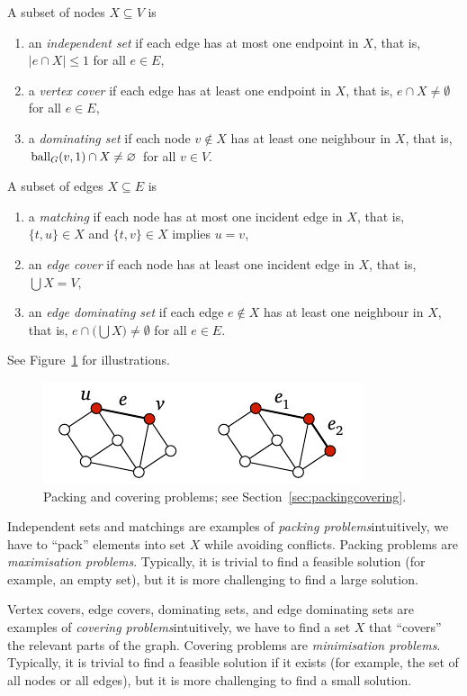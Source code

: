 A subset of nodes $X \subseteq V$ is
\begin{enumerate}
    \item an \emph{independent set} if each edge has at most one endpoint in $X$, that is, $|e \cap X| \le 1$ for all $e \in E$,
    \item a \emph{vertex cover} if each edge has at least one endpoint in $X$, that is, $e \cap X \ne \emptyset$ for all $e \in E$,
    \item a \emph{dominating set} if each node $v \notin X$ has at least one neighbour in $X$, that is, $\operatorname{ball}_G(v,1) \cap X \ne \varnothing$ for all $v \in V$.
\end{enumerate}
A subset of edges $X \subseteq E$ is
\begin{enumerate}[resume]
    \item a \emph{matching} if each node has at most one incident edge in $X$, that is, $\{t,u\} \in X$ and $\{t,v\} \in X$ implies $u = v$,
    \item an \emph{edge cover} if each node has at least one incident edge in $X$, that is, $\bigcup X = V$,
    \item an \emph{edge dominating set} if each edge $e \notin X$ has at least one neighbour in $X$, that is, $e \cap \bigl(\bigcup X\bigr) \ne \emptyset$ for all $e \in E$.
\end{enumerate}
See Figure~\ref{fig:packingcovering} for illustrations.
\begin{figure}
    \centering
    \includegraphics[page=\PPackingCovering]{figs.pdf}
    \caption{Packing and covering problems; see Section~\ref{sec:packingcovering}.}\label{fig:packingcovering}
\end{figure}

Independent sets and matchings are examples of \emph{packing problems}\mydash intuitively, we have to ``pack'' elements into set $X$ while avoiding conflicts. Packing problems are \emph{maximisation problems}. Typically, it is trivial to find a feasible solution (for example, an empty set), but it is more challenging to find a large solution.

Vertex covers, edge covers, dominating sets, and edge dominating sets are examples of \emph{covering problems}\mydash intuitively, we have to find a set $X$ that ``covers'' the relevant parts of the graph. Covering problems are \emph{minimisation problems}. Typically, it is trivial to find a feasible solution if it exists (for example, the set of all nodes or all edges), but it is more challenging to find a small solution.

